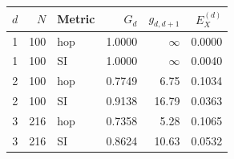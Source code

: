 \begin{tabular}{rrlrrr}
\toprule
$d$ & $N$ & Metric & $G_d$ & $g_{d,d+1}$ & $E_X^{(d)}$ \\
\midrule
1 & 100 & hop & 1.0000 & $\infty$ & 0.0000 \\
1 & 100 & SI & 1.0000 & $\infty$ & 0.0040 \\
2 & 100 & hop & 0.7749 & 6.75 & 0.1034 \\
2 & 100 & SI & 0.9138 & 16.79 & 0.0363 \\
3 & 216 & hop & 0.7358 & 5.28 & 0.1065 \\
3 & 216 & SI & 0.8624 & 10.63 & 0.0532 \\
\bottomrule
\end{tabular}
